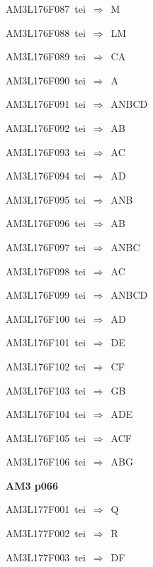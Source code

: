{\sixrm AM3L176F087\ {\sixit tei}\ }$\Rightarrow$\ M\par\smallskip
{\sixrm AM3L176F088\ {\sixit tei}\ }$\Rightarrow$\ LM\par\smallskip
{\sixrm AM3L176F089\ {\sixit tei}\ }$\Rightarrow$\ CA\par\smallskip
{\sixrm AM3L176F090\ {\sixit tei}\ }$\Rightarrow$\ A\par\smallskip
{\sixrm AM3L176F091\ {\sixit tei}\ }$\Rightarrow$\ ANBCD\par\smallskip
{\sixrm AM3L176F092\ {\sixit tei}\ }$\Rightarrow$\ AB\par\smallskip
{\sixrm AM3L176F093\ {\sixit tei}\ }$\Rightarrow$\ AC\par\smallskip
{\sixrm AM3L176F094\ {\sixit tei}\ }$\Rightarrow$\ AD\par\smallskip
{\sixrm AM3L176F095\ {\sixit tei}\ }$\Rightarrow$\ ANB\par\smallskip
{\sixrm AM3L176F096\ {\sixit tei}\ }$\Rightarrow$\ AB\par\smallskip
{\sixrm AM3L176F097\ {\sixit tei}\ }$\Rightarrow$\ ANBC\par\smallskip
{\sixrm AM3L176F098\ {\sixit tei}\ }$\Rightarrow$\ AC\par\smallskip
{\sixrm AM3L176F099\ {\sixit tei}\ }$\Rightarrow$\ ANBCD\par\smallskip
{\sixrm AM3L176F100\ {\sixit tei}\ }$\Rightarrow$\ AD\par\smallskip
{\sixrm AM3L176F101\ {\sixit tei}\ }$\Rightarrow$\ DE\par\smallskip
{\sixrm AM3L176F102\ {\sixit tei}\ }$\Rightarrow$\ CF\par\smallskip
{\sixrm AM3L176F103\ {\sixit tei}\ }$\Rightarrow$\ GB\par\smallskip
{\sixrm AM3L176F104\ {\sixit tei}\ }$\Rightarrow$\ ADE\par\smallskip
{\sixrm AM3L176F105\ {\sixit tei}\ }$\Rightarrow$\ ACF\par\smallskip
{\sixrm AM3L176F106\ {\sixit tei}\ }$\Rightarrow$\ ABG\par\smallskip

\par\vfill\eject
{\bf\hfill AM3 p066\hfill\hbox{}}\par\bigskip
{\sixrm AM3L177F001\ {\sixit tei}\ }$\Rightarrow$\ Q\par\smallskip
{\sixrm AM3L177F002\ {\sixit tei}\ }$\Rightarrow$\ R\par\smallskip
{\sixrm AM3L177F003\ {\sixit tei}\ }$\Rightarrow$\ DF\par\smallskip

